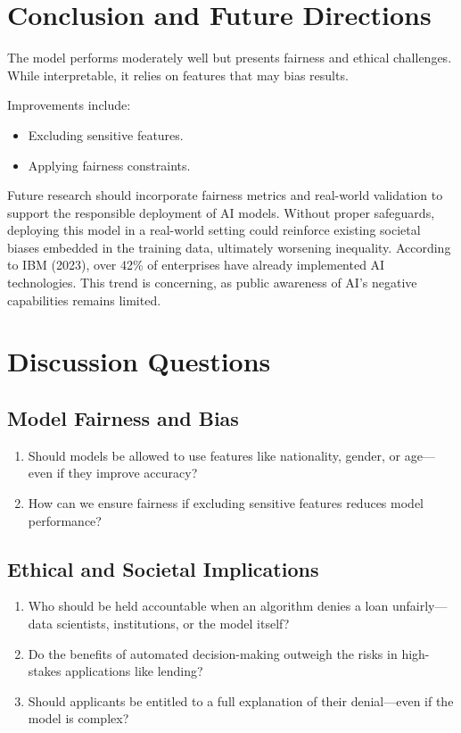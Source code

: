 \documentclass[12pt]{article}
\begin{document}
	\section{Conclusion and Future Directions}
	The model performs moderately well but presents fairness and ethical challenges. While interpretable, it relies on features that may bias results. 
	
	Improvements include:
	\begin{itemize}
		\item Excluding sensitive features.
		\item Applying fairness constraints.
	\end{itemize}
	
	Future research should incorporate fairness metrics and real-world validation to support the responsible deployment of AI models. Without proper safeguards, deploying this model in a real-world setting could reinforce existing societal biases embedded in the training data, ultimately worsening inequality. According to IBM (2023), over 42\% of enterprises have already implemented AI technologies. This trend is concerning, as public awareness of AI’s negative capabilities remains limited.
	

	\section{Discussion Questions}
	
	\subsection*{Model Fairness and Bias}
	\begin{enumerate}
		\item Should models be allowed to use features like nationality, gender, or age—even if they improve accuracy?
		\item How can we ensure fairness if excluding sensitive features reduces model performance?
	\end{enumerate}
	
	\subsection*{Ethical and Societal Implications}
	\begin{enumerate}
		\item Who should be held accountable when an algorithm denies a loan unfairly—data scientists, institutions, or the model itself?
		\item Do the benefits of automated decision-making outweigh the risks in high-stakes applications like lending?
		\item Should applicants be entitled to a full explanation of their denial—even if the model is complex?
	\end{enumerate}
	
\end{document}
